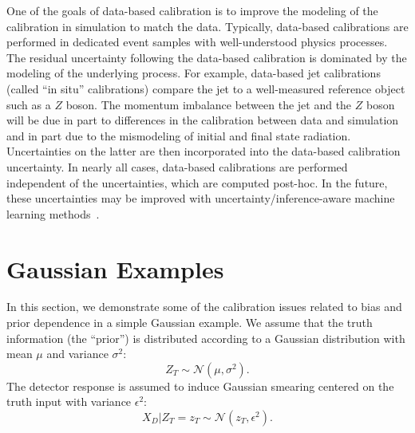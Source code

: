 \documentclass[aps,prd,reprint,preprintnumbers,superscriptaddress,nofootinbib,longbibliography,floatfix]{revtex4-1}
\begin{document}
One of the goals of data-based calibration is to improve the modeling of the calibration in simulation to match the data.
%
Typically, data-based calibrations are performed in dedicated event samples with well-understood physics processes.
%
The residual uncertainty following the data-based calibration is dominated by the modeling of the underlying process.
%
For example, data-based jet calibrations (called ``in situ'' calibrations) compare the jet to a well-measured reference object such as a $Z$ boson.
%
The momentum imbalance between the jet and the $Z$ boson will be due in part to differences in the calibration between data and simulation and in part due to the mismodeling of initial and final state radiation.
%
Uncertainties on the latter are then incorporated into the data-based calibration uncertainty.
%
In nearly all cases, data-based calibrations are performed independent of the uncertainties, which are computed post-hoc.
%
In the future, these uncertainties may be improved with uncertainty/inference-aware machine learning methods~\cite{Blance:2019ibf,Englert:2018cfo,Louppe:2016ylz,Dolen:2016kst,Moult:2017okx,Stevens:2013dya,Shimmin:2017mfk,Bradshaw:2019ipy,ATL-PHYS-PUB-2018-014,DiscoFever,Wunsch:2019qbo,Rogozhnikov:2014zea,10.1088/2632-2153/ab9023,clavijo2020adversarial,Kasieczka:2020pil,Kitouni:2020xgb,Estrade:2019gzk,Wunsch:2020iuh,Elwood:2020pik,Xia:2018kgd,deCastro:2018mgh,Charnock_2018,Alsing:2019dvb,lukas_heinrich_2020_3697981,Kasieczka:2020vlh,Bollweg:2019skg,Araz:2021wqm,Bellagente:2021yyh,Nachman:2019dol,1807719,Ghosh:2021hrh,Ghosh:2021roe}.  


\section{Gaussian Examples}
\label{sec:gaussian}

In this section, we demonstrate some of the calibration issues related to bias and prior dependence in a simple Gaussian example.
%
We assume that the truth information (the ``prior'') is distributed according to a Gaussian distribution with mean $\mu$ and variance $\sigma^2$:
%
\begin{equation}
Z_T\sim\mathcal{N}(\mu,\sigma^2).
\end{equation}
%
The detector response is assumed to induce Gaussian smearing centered on the truth input with variance $\epsilon^2$:
%
\begin{equation}
X_D|Z_T=z_T\sim\mathcal{N}(z_T,\epsilon^2).
\end{equation}
\end{document}
